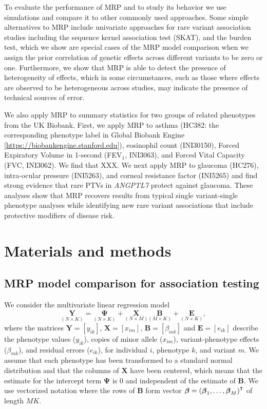 To evaluate the performance of MRP and to study its behavior we use simulations and compare it to other commonly used approaches. Some simple alternatives to MRP include univariate approaches for rare variant association studies including the sequence kernel association test (SKAT)\cite{skat}, and the burden test, which we show are special cases of the MRP model comparison when we assign the prior correlation of genetic effects across different variants to be zero or one. Furthermore, we show that MRP is able to detect the presence of heterogeneity of effects, which in some circumstances, such as those where effects are observed to be heterogeneous across studies, may indicate the presence of technical sources of error. 
  
We also apply MRP to summary statistics for two groups of related phenotypes from the UK Biobank. First, we apply MRP to asthma (HC382: the corresponding phenotype label in Global Biobank Engine [\url{https://biobankengine.stanford.edu}]), eosinophil count (INI30150), Forced Expiratory Volume in 1-second (FEV$_1$, INI3063), and Forced Vital Capacity (FVC, INI3062). We find that XXX. We next apply MRP to glaucoma (HC276), intra-ocular pressure (INI5263), and corneal resistance factor (INI5265) and find strong evidence that rare PTVs in \textit{ANGPTL7} protect against glaucoma. These analyses show that MRP recovers results from typical single variant-single phenotype analyses while identifying new rare variant associations that include protective modifiers of disease risk.

\section*{Materials and methods}
\subsection*{MRP model comparison for association testing}
We consider the multivariate linear regression model 
$$\underset{\left(N\times K\right)}{\mathbf{\textrm{Y}}} 
= \underset{\left(N\times K\right)}{\mathbf{\Psi}}  + \underset{\left(N\times M\right)}{\mathbf{\textrm{X}}}\underset{\left(M \times K\right)}{\mathbf{\textrm{B}}} 
+ \underset{\left(N\times K\right)}{\mathbf{\textrm{E}}},$$
where the matrices $\mathbf{\textrm{Y}} = \left[{y}_{i k}\right]$, $\mathbf{\textrm{X}} = \left[ x_{i m}\right]$, 
$\mathbf{\textrm{B}} = \left[ \beta_{m k} \right]$ and $\mathbf{\textrm{E}} = \left[e_{i k}\right]$  describe the phenotype values ($y_{i k}$),
copies of minor allele ($x_{i m}$), variant-phenotype effects ($\beta_{m k}$), and residual errors ($e_{i k}$), 
for individual $i$, phenotype $k$, and variant $m$. 
We assume that each phenotype has been transformed to a standard normal
distribution and that the columns of ${\mathbf{{\textrm{X}}}}$ 
have been centered, which means that the estimate for the intercept term ${\mathbf{\Psi}}$ is 0 and independent of the estimate of ${\mathbf{\textrm{B}}}$.
We use vectorized notation where the rows of ${\mathbf{\textrm{B}}}$ form vector 
$\boldsymbol {{ \beta}} = \left(\boldsymbol {{ \beta}}_{1},\dots,\boldsymbol {{\beta}}_{M}\right)^{\intercal}$
of length $MK$.

